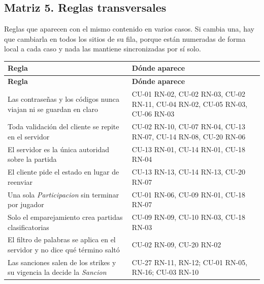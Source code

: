 \subsection*{Matriz 5. Reglas transversales}
Reglas que aparecen con el mismo contenido en varios casos. Si cambia una, hay que cambiarla en todos los sitios de su fila, porque están numeradas de forma local a cada caso y nada las mantiene sincronizadas por sí solo.

\begin{center}\small
\begin{longtable}{|L{0.445\textwidth}|L{0.455\textwidth}|}
\hline
\textbf{Regla} & \textbf{Dónde aparece} \\ \hline
\endfirsthead
\hline
\textbf{Regla} & \textbf{Dónde aparece} \\ \hline
\endhead
Las contraseñas y los códigos nunca viajan ni se guardan en claro & \mbox{CU-01} \mbox{RN-02}, \mbox{CU-02} \mbox{RN-03}, \mbox{CU-02} \mbox{RN-11}, \mbox{CU-04} \mbox{RN-02}, \mbox{CU-05} \mbox{RN-03}, \mbox{CU-06} \mbox{RN-03} \\ \hline
Toda validación del cliente se repite en el servidor & \mbox{CU-02} \mbox{RN-10}, \mbox{CU-07} \mbox{RN-04}, \mbox{CU-13} \mbox{RN-07}, \mbox{CU-14} \mbox{RN-08}, \mbox{CU-20} \mbox{RN-06} \\ \hline
El servidor es la única autoridad sobre la partida & \mbox{CU-13} \mbox{RN-01}, \mbox{CU-14} \mbox{RN-01}, \mbox{CU-18} \mbox{RN-04} \\ \hline
El cliente pide el estado en lugar de reenviar & \mbox{CU-13} \mbox{RN-13}, \mbox{CU-14} \mbox{RN-13}, \mbox{CU-20} \mbox{RN-07} \\ \hline
Una sola \textit{Participacion} sin terminar por jugador & \mbox{CU-01} \mbox{RN-06}, \mbox{CU-09} \mbox{RN-01}, \mbox{CU-18} \mbox{RN-07} \\ \hline
Solo el emparejamiento crea partidas clasificatorias & \mbox{CU-09} \mbox{RN-09}, \mbox{CU-10} \mbox{RN-03}, \mbox{CU-18} \mbox{RN-03} \\ \hline
El filtro de palabras se aplica en el servidor y no dice qué término saltó & \mbox{CU-02} \mbox{RN-09}, \mbox{CU-20} \mbox{RN-02} \\ \hline
Las sanciones salen de los strikes y su vigencia la decide la \textit{Sancion} & \mbox{CU-27} \mbox{RN-11}, \mbox{RN-12}; \mbox{CU-01} \mbox{RN-05}, \mbox{RN-16}; \mbox{CU-03} \mbox{RN-10} \\ \hline
\end{longtable}
\end{center}

